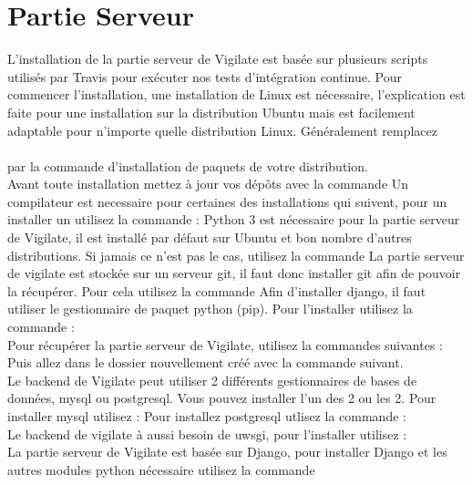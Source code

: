 \section{Partie Serveur}
L’installation de la partie serveur de Vigilate est basée sur plusieurs scripts utilisés par Travis pour exécuter nos tests d’intégration continue.
Pour commencer l’installation, une installation de Linux est nécessaire, l’explication est faite pour une installation sur la distribution Ubuntu mais est facilement adaptable pour n’importe quelle distribution Linux. Généralement remplacez\\
\\
par la commande d’installation de paquets de votre distribution.\\
Avant toute installation mettez à jour vos dépôts avec la commande
Un compilateur est necessaire pour certaines des installations qui suivent, pour un installer un utilisez la commande :
Python 3 est nécessaire pour la partie serveur de Vigilate, il est installé par défaut sur Ubuntu et bon nombre d’autres distributions. Si jamais ce n’est pas le cas, utilisez la commande
La partie serveur de vigilate est stockée sur un serveur git, il faut donc installer git afin de pouvoir la récupérer. Pour cela utilisez la commande
Afin d’installer django, il faut utiliser le gestionnaire de paquet python (pip). Pour l’installer utilisez la commande :
\\
Pour récupérer la partie serveur de Vigilate, utilisez la commandes suivantes :
Puis allez dans le dossier nouvellement créé avec la commande suivant.
\\
Le backend de Vigilate peut utiliser 2 différents gestionnaires de bases de données, mysql ou postgresql. Vous pouvez installer l’un des 2 ou les 2. Pour installer mysql utilisez :
Pour installez postgresql utlisez la commande :
\\
Le backend de vigilate à aussi besoin de uwsgi, pour l’installer utilisez :
\\
La partie serveur de Vigilate est basée sur Django, pour installer Django et les autres modules python nécessaire utilisez la commande
